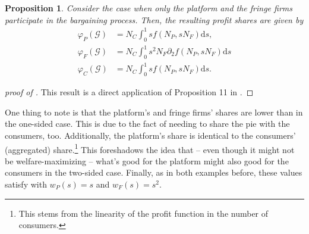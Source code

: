 \documentclass[a4paper]{article}
\newtheorem{proposition}{Proposition}
\newcommand{\ds}{\mathrm{d}s}
\begin{document}
\begin{proposition}
    \label{prop:profit_sharing_two_sided}
    Consider the case when only the platform and the fringe firms participate in the bargaining process.
    Then, the resulting profit shares are given by
    \begin{align*}
        \varphi_P(\mathcal{G}) &= N_C \int_0^1 s f(N_P, s N_F) \ds, \\
        \varphi_F(\mathcal{G}) &= N_C \int_0^1 s^2 N_F \partial_2 f(N_P, s N_F) \ds \\
        \varphi_C(\mathcal{G}) &= N_C \int_0^1 s f(N_P, s N_F) \ds.
    \end{align*}
\end{proposition}
\begin{proof}[proof of ]
    This result is a direct application of Proposition 11 in \textcite{stancsics2023value}.
\end{proof}

One thing to note is that the platform's and fringe firms' shares are lower than in the one-sided case.
This is due to the fact of needing to share the pie with the consumers, too.
Additionally, the platform's share is identical to the consumers' (aggregated) share.\footnote{
    This stems from the linearity of the profit function in the number of consumers.
}
This foreshadows the idea that -- even though it might not be welfare-maximizing -- what's good for the platform might also good for the consumers in the two-sided case.
Finally, as in both examples before, these values satisfy  with $w_P(s) = s$ and $w_F(s) = s^2$.




\end{document}
